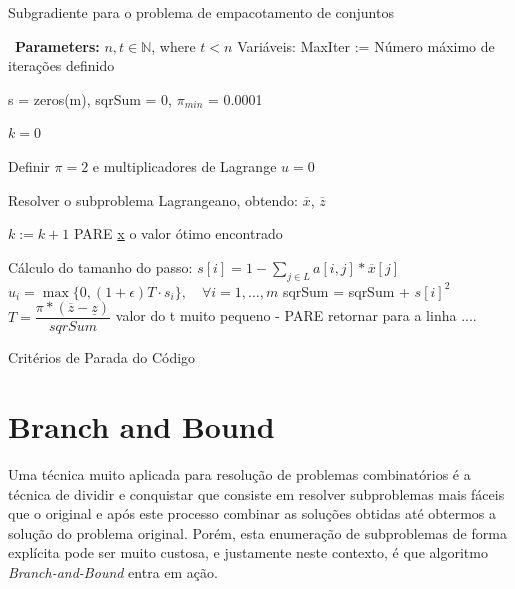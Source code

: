 \documentclass{article}
\begin{document}
	\begin{algorithm}
    \caption{Subgradiente para o problema de empacotamento de conjuntos}
        \begin{algorithmic}[1]
            \Statex \textbullet~\textbf{Parameters:} $n, t \in \mathbb{N}$, where $t < n$
            \State Variáveis:
            \State MaxIter := Número máximo de iterações definido
            
            \State s = zeros(m), sqrSum = 0, $\pi_{min}$ = 0.0001
            
            \State $k = 0$ 
            
            \State Definir $\pi = 2$ e multiplicadores de Lagrange $u = 0$
            
            \State Resolver o subproblema Lagrangeano, obtendo: $\overline{x}$, $\overline{z}$
            
            \State $k := k + 1$
            \State {}  
            \State \Return PARE
            \State \EndIf
            \State {}  
            \State \Return \underline{x} 
            \State \EndIf
            \State {}  
            \State \Return o valor ótimo encontrado
            \State \EndIf
            
    
            \Statex
            \Statex Cálculo do tamanho do passo: 
            \State 
            \State $s[i] = 1 - \sum_{j\in L} a[i,j]*\overline{x}[j]$
            \State $u_i = \max \{0,(1+ \epsilon) T \cdot s_i\}, \quad \forall i= 1,\dots,m$
            \State sqrSum = sqrSum + $s[i]^2$
            \EndFor
            \State $T = \dfrac{\pi * (\overline{z} - \underline{z})}{sqrSum} $
            \State {}
            \State \Return valor do t muito pequeno - PARE
            \State \EndIf
            \State retornar para a linha ....
    
    
            \Statex
            \Statex Critérios de Parada do Código
            
    
    
        \end{algorithmic}
    \end{algorithm}
	
	
	\section{Branch and Bound}\label{sec:BB}
	Uma técnica muito aplicada para resolução de problemas combinatórios é a técnica de dividir e conquistar que consiste em resolver subproblemas mais fáceis que o original e após este processo combinar as soluções obtidas até obtermos a solução do problema original. Porém, esta enumeração de subproblemas de forma explícita pode ser muito custosa, e justamente neste contexto, é que algoritmo \emph{Branch-and-Bound} entra em ação.
	
\end{document}

